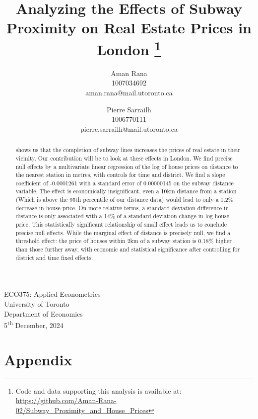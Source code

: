 \documentclass[11pt,a4paper,english]{article}
\date{\displaydate{date}}
\title{Analyzing the Effects of Subway Proximity on Real Estate Prices in London 
\thanks{Code and data supporting this analysis is available at: \url{https://github.com/Aman-Rana-02/Subway_Proximity_and_House_Prices}}}
\author{%
  Aman Rana \\ 1007034692 \\ aman.rana@mail.utoronto.ca
  \and
  Pierre Sarrailh \\ 1006770111 \\ pierre.sarrailh@mail.utoronto.ca
}
\date{}
\begin{document}
  \maketitle
  \begin{center}
    ECO375: Applied Econometrics \\ 
    University of Toronto \\ 
    Department of Economics \\
    5\textsuperscript{th} December, 2024
  \end{center}

  \begin{abstract}
    \noindent \citet{zhou_2019} shows us that the completion of subway lines increases the prices of real estate in their vicinity. Our contribution will be to look at these effects in London. 
     We find precise null effects by a multivariate linear regression of the log of house prices on distance to the nearest station in metres, with controls for time and district.
    We find a slope coefficient of -0.0001261 with a standard error of 0.00000145 on the subway distance variable. 
     The effect is economically insignificant, even a 10km distance from a station (Which is above the 95th percentile of our distance data) would lead to only a 0.2\% decrease in house price.
     On more relative terms, a standard deviation difference in distance is only associated with a 14\% of a standard deviation change in log house price. 
     This statistically significant relationship of small effect leads us to conclude precise null effects.
      While the marginal effect of distance is precisely null, we find a threshold effect:
      the price of houses within 2km of a subway station is 0.18\% higher than those further away, with economic and statistical significance after controlling for district and time fixed effects.
  \end{abstract}


  \newpage
  

  

  

  

  \newpage
  
  

  \newpage
  \section*{Appendix}
  \renewcommand{\thesection}{\Alph{section}}
  \setcounter{section}{0}
  
\end{document}
